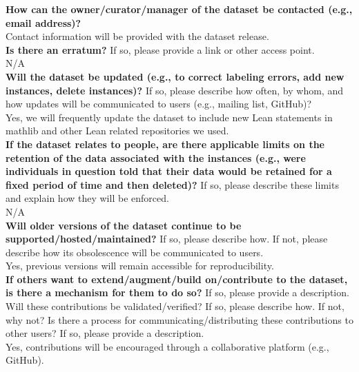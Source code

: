     \textcolor{\sectioncolor}{\textbf{How can the owner/curator/manager of the dataset be contacted (e.g., email
    address)?
    }
    } \\
    Contact information will be provided with the dataset release. \\

    \textcolor{\sectioncolor}{\textbf{Is there an erratum?
    }
    If so, please provide a link or other access point.
    } \\
    N/A \\

    \textcolor{\sectioncolor}{\textbf{Will the dataset be updated (e.g., to correct labeling errors, add new
    instances, delete instances)?
    }
    If so, please describe how often, by whom, and how updates will be
    communicated to users (e.g., mailing list, GitHub)?
    } \\
    Yes, we will frequently update the dataset to include new Lean statements in mathlib and other Lean related repositories we used.  \\

    \textcolor{\sectioncolor}{\textbf{If the dataset relates to people, are there applicable limits on the
    retention of the data associated with the instances (e.g., were individuals
    in question told that their data would be retained for a fixed period of
    time and then deleted)?
    }
    If so, please describe these limits and explain how they will be enforced.
    } \\
    N/A \\

    \textcolor{\sectioncolor}{\textbf{Will older versions of the dataset continue to be
    supported/hosted/maintained?
    }
    If so, please describe how. If not, please describe how its obsolescence
    will be communicated to users.
    } \\
    Yes, previous versions will remain accessible for reproducibility. \\

    \textcolor{\sectioncolor}{\textbf{If others want to extend/augment/build on/contribute to the dataset, is
    there a mechanism for them to do so?
    }
    If so, please provide a description. Will these contributions be
    validated/verified? If so, please describe how. If not, why not? Is there a
    process for communicating/distributing these contributions to other users?
    If so, please provide a description.
    } \\
    Yes, contributions will be encouraged through a collaborative platform (e.g., GitHub).\\


